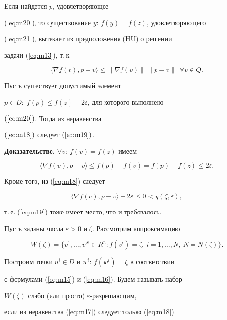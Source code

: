 \begin{note}


Если найдется $p$, удовлетворяющее 


(\ref{eq:m20}), то существование $y:\, f(y)=f(z)$, удовлетворяющего


(\ref{eq:m21}), вытекает из предположения (HU) о решении


задачи (\ref{eq:m13}), т.\,к.


$$


\langle \nabla f(v),p-v \rangle \leq 


\| \nabla f(v) \|\, \| p-v \| \ \; \forall v \in Q.


$$


\end{note}





\begin{lem}\label{Lemma1} Пусть существует допустимый элемент


$p\in D: \; f(p)\leq f(z)+2\varepsilon $, для которого выполнено


$(\ref{eq:m20})$. Тогда из неравенства


$(\ref{eq:m18})$ следует $(\ref{eq:m19})$.


\end{lem}





{\bf Доказательство.} $\forall v: \; f(v)=f(z)$ имеем 


$$


\langle \nabla f(v),p-v \rangle \leq f(p)-f(v)=f(p)-f(z)\leq 2\varepsilon.


$$


Кроме того, из (\ref{eq:m18}) следует


$$


\langle \nabla f(v),p-v \rangle - 2\varepsilon \leq 0 <


\eta(\zeta,\varepsilon),


$$


т.\,е. (\ref{eq:m19}) тоже имеет место, что и требовалось.





\begin{defn}


Пусть заданы числа $\varepsilon >0$ и $\zeta$. Рассмотрим аппроксимацию


$$


W (\zeta) =\{ v^{1},\dotsc,v^{N} \in R^{n} :


f(v^{i})=\zeta,\ i=1,\dotsc, N,\ N=N(\zeta) \}.


$$


Построим точки $u^{i} \in D $ и $w^{i}: \, f(w^{i})=\zeta$ в соответствии


с формулами (\ref{eq:m15}) и (\ref{eq:m16}). Будем называть набор


$W (\zeta)$ слабо (или просто) $\varepsilon$-разрешающим, 


если из неравенства (\ref{eq:m17}) следует только (\ref{eq:m18}).


\end{defn}





